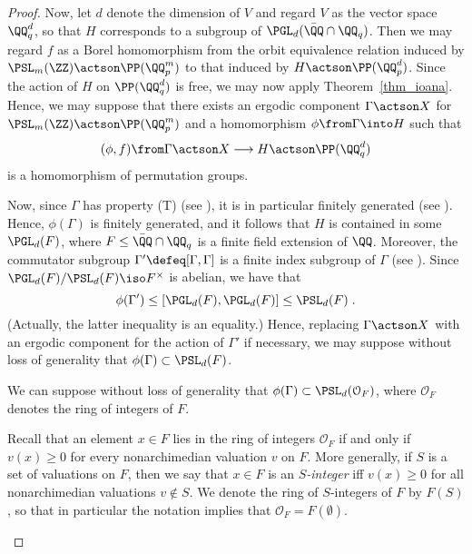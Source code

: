 \documentclass[oneside,leqno,11pt]{amsart}
\begin{document}
\begin{proof}
  Now, let $d$ denote the dimension of $V$ and regard $V$ as the
  vector space $\QQ_q^d$, so that $H$ corresponds to a subgroup of
  $\PGL_d(\bar\QQ\cap\QQ_q)$.  Then we may regard $f$ as a Borel
  homomorphism from the orbit equivalence relation induced by
  $\PSL_m(\ZZ)\actson\PP(\QQ_p^m)$ to that induced by
  $H\actson\PP(\QQ_p^d)$.  Since the action of $H$ on $\PP(\QQ_q^d)$
  is free, we may now apply Theorem~\ref{thm_ioana}.  Hence, we may
  suppose that there exists an ergodic component $\Gamma\actson X$ for
  $\PSL_m(\ZZ)\actson\PP(\QQ_p^m)$ and a homomorphism
  $\phi\from\Gamma\into H$ such that
  \[(\phi,f)\from\Gamma\actson X\longrightarrow H\actson\PP(\QQ_q^d)
  \]
  is a homomorphism of permutation groups.

  Now, since $\Gamma$ has property (T) (see
  \cite[Theorem~1.5]{lubotzky}), it is in particular finitely
  generated (see \cite[Proposition~1.24]{lubotzky}).  Hence,
  $\phi(\Gamma)$ is finitely generated, and it follows that $H$ is
  contained in some $\PGL_d(F)$, where $F\leq\bar\QQ\cap\QQ_q$ is a
  finite field extension of $\QQ$.  Moreover, the commutator subgroup
  $\Gamma'\defeq[\Gamma,\Gamma]$ is a finite index subgroup of
  $\Gamma$ (see \cite[Corollary 1.29]{lubotzky}).  Since
  $\PGL_d(F)/\PSL_d(F)\iso F^\times$ is abelian, we have that
  \[\phi(\Gamma')\leq [\PGL_d(F),\PGL_d(F)]\leq\PSL_d(F)\;.
  \]
  (Actually, the latter inequality is an equality.)  Hence, replacing
  $\Gamma\actson X$ with an ergodic component for the action of
  $\Gamma'$ if necessary, we may suppose without loss of generality
  that $\phi(\Gamma)\subset\PSL_d(F)$.
  
  \begin{claim*}
    We can suppose without loss of generality that
    $\phi(\Gamma)\subset\PSL_d(\mathcal O_F)$, where $\mathcal O_F$
    denotes the ring of integers of $F$.
  \end{claim*}

  \begin{claimproof}
    Recall that an element $x\in F$ lies in the ring of integers
    $\mathcal O_F$ if and only if $v(x)\geq0$ for every nonarchimedian
    valuation $v$ on $F$.  More generally, if $S$ is a set of
    valuations on $F$, then we say that $x\in F$ is an
    \emph{$S$\nobreakdash-integer} iff $v(x)\geq0$ for all
    nonarchimedian valuations $v\notin S$.  We denote the ring of
    $S$-integers of $F$ by $F(S)$, so that in particular the notation
    implies that $\mathcal O_F=F(\emptyset)$.


\end{claimproof}
\end{proof}
\end{document}
